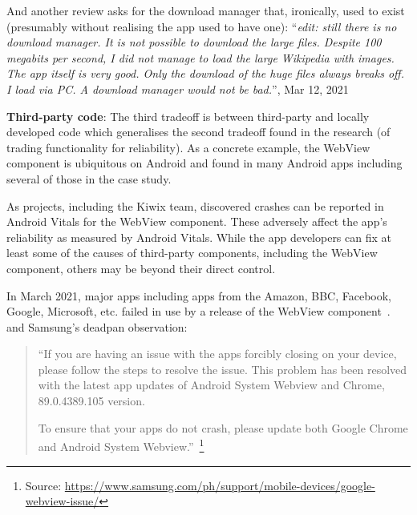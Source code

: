 And another review asks for the download manager that, ironically, used to exist (presumably without realising the app used to have one): ``\textit{edit: still there is no download manager. It is not possible to download the large files. Despite 100 megabits per second, I did not manage to load the large Wikipedia with images. The app itself is very good. Only the download of the huge files always breaks off. I load via PC. A download manager would not be bad.}'', Mar 12, 2021 %

\textbf{Third-party code}: 
The third tradeoff is between third-party and locally developed code which generalises the second tradeoff found in the research (of trading functionality for reliability). As a concrete example, the WebView component is ubiquitous on Android and found in many Android apps including several of those in the case study. 


As projects, including the Kiwix team, discovered crashes can be reported in Android Vitals for the WebView component. These adversely affect the app's reliability as measured by Android Vitals. While the app developers can fix at least some of the causes of third-party components, including the WebView component, others may be beyond their direct control.

In March 2021, major apps including apps from the Amazon, BBC, Facebook, Google, Microsoft, etc. failed in use by a release of the WebView component~\citep{peters2021_google_fixes_issue_causing_android_apps_to_crash_etc_webview, bbcnews2021_google_fixes_crashing_android_app_issues, bbc_iplayer_app_april_2021_webview_information}. and Samsung's deadpan observation:

\begin{quote}
    ``If you are having an issue with the apps forcibly closing on your device, please follow the steps to resolve the issue. This problem has been resolved with the latest app updates of Android System Webview and Chrome, 89.0.4389.105 version.

    To ensure that your apps do not crash, please update both Google Chrome and Android System Webview.''~\footnote{Source: \url{https://www.samsung.com/ph/support/mobile-devices/google-webview-issue/}}
\end{quote}



